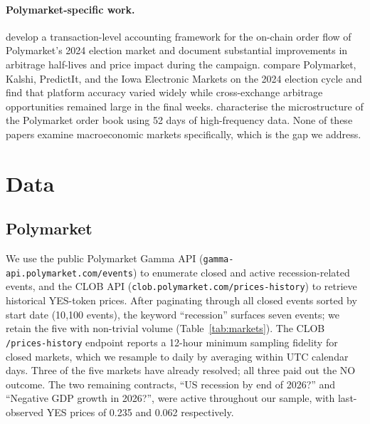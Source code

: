 \documentclass{article}
\begin{document}
\paragraph{Polymarket-specific work.}
\citet{tsang2026anatomy} develop a transaction-level accounting framework for the on-chain order flow of Polymarket's 2024 election market and document substantial improvements in arbitrage half-lives and price impact during the campaign. \citet{clinton2025prediction} compare Polymarket, Kalshi, PredictIt, and the Iowa Electronic Markets on the 2024 election cycle and find that platform accuracy varied widely while cross-exchange arbitrage opportunities remained large in the final weeks. \citet{dubach2026anatomy} characterise the microstructure of the Polymarket order book using 52 days of high-frequency data. None of these papers examine macroeconomic markets specifically, which is the gap we address.

\section{Data}

\subsection{Polymarket}

We use the public Polymarket Gamma API (\texttt{gamma-api.polymarket.com/events}) to enumerate closed and active recession-related events, and the CLOB API (\texttt{clob.polymarket.com/prices-history}) to retrieve historical YES-token prices. After paginating through all closed events sorted by start date (10{,}100 events), the keyword ``recession'' surfaces seven events; we retain the five with non-trivial volume (Table~\ref{tab:markets}). The CLOB \texttt{/prices-history} endpoint reports a 12-hour minimum sampling fidelity for closed markets, which we resample to daily by averaging within UTC calendar days. Three of the five markets have already resolved; all three paid out the NO outcome. The two remaining contracts, ``US recession by end of 2026?'' and ``Negative GDP growth in 2026?'', were active throughout our sample, with last-observed YES prices of \num{0.235} and \num{0.062} respectively.
\end{document}

